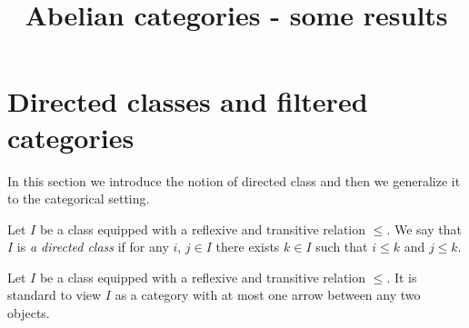 


\title{Abelian categories - some results}
\date{}
\maketitle

\section{Directed classes and filtered categories}
\noindent
In this section we introduce the notion of directed class and then we generalize it to the categorical setting.

\begin{definition}
Let $I$ be a class equipped with a reflexive and transitive relation $\leq$. We say that $I$ is \textit{a directed class} if for any $i$, $j\in I$ there exists $k\in I$ such that $i\leq k$ and $j\leq k$.
\end{definition}
\noindent
Let $I$ be a class equipped with a reflexive and transitive relation $\leq$. It is standard {\cite[page 11]{Maclane}} to view $I$ as a category with at most one arrow between any two objects.

